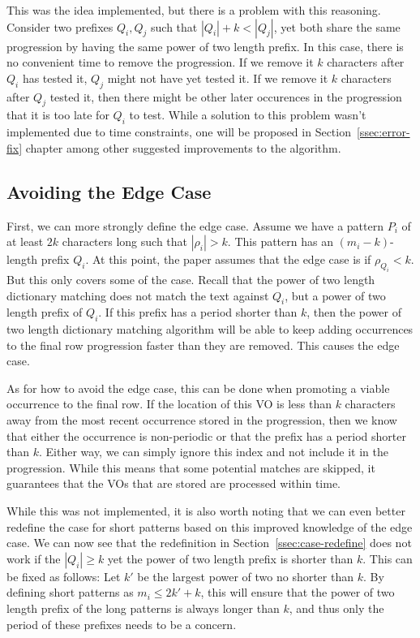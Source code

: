 \documentclass[ %
                    author={Dominic Joseph Moylett},
                    degree={MEng},
                     title={Dictionary Matching with Fingerprints},
                  subtitle={An Empirical Analysis},
                      type={research},
                      year={2015} ]{dissertation}
\begin{document}
This was the idea implemented, but there is a problem with this reasoning. Consider two prefixes $Q_i, Q_j$ such that $|Q_i| + k < |Q_j|$, yet both share the same progression by having the same power of two length prefix. In this case, there is no convenient time to remove the progression. If we remove it $k$ characters after $Q_i$ has tested it, $Q_j$ might not have yet tested it. If we remove it $k$ characters after $Q_j$ tested it, then there might be other later occurences in the progression that it is too late for $Q_i$ to test. While a solution to this problem wasn't implemented due to time constraints, one will be proposed in Section~\ref{ssec:error-fix} chapter among other suggested improvements to the algorithm.

\subsection{Avoiding the Edge Case}
\label{ssec:impl-edge-case}

First, we can more strongly define the edge case. Assume we have a pattern $P_i$ of at least $2k$ characters long such that $|\rho_i| > k$. This pattern has an $(m_i - k)$-length prefix $Q_i$. At this point, the paper assumes that the edge case is if $\rho_{Q_i} < k$. But this only covers some of the case. Recall that the power of two length dictionary matching does not match the text against $Q_i$, but a power of two length prefix of $Q_i$. If this prefix has a period shorter than $k$, then the power of two length dictionary matching algorithm will be able to keep adding occurrences to the final row progression faster than they are removed. This causes the edge case.

As for how to avoid the edge case, this can be done when promoting a viable occurrence to the final row. If the location of this VO is less than $k$ characters away from the most recent occurrence stored in the progression, then we know that either the occurrence is non-periodic or that the prefix has a period shorter than $k$. Either way, we can simply ignore this index and not include it in the progression. While this means that some potential matches are skipped, it guarantees that the VOs that are stored are processed within time.

While this was not implemented, it is also worth noting that we can even better redefine the case for short patterns based on this improved knowledge of the edge case. We can now see that the redefinition in Section~\ref{ssec:case-redefine} does not work if the $|Q_i| \geq k$ yet the power of two length prefix is shorter than $k$. This can be fixed as follows: Let $k'$ be the largest power of two no shorter than $k$. By defining short patterns as $m_i \leq 2k' + k$, this will ensure that the power of two length prefix of the long patterns is always longer than $k$, and thus only the period of these prefixes needs to be a concern.
\end{document}
